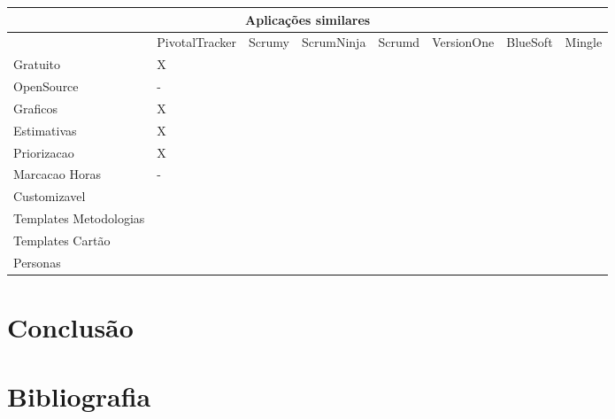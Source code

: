 \documentclass[titlepage,a4paper]{article}
\begin{document}
\begin{sidewaystable}
	\begin{tabular}{|l|l|l|l|l|l|l|l}
		\hline
		\multicolumn{8}{|c|}{Aplicações similares} \\
		\hline
		 & PivotalTracker & Scrumy & ScrumNinja & Scrumd & VersionOne & BlueSoft & Mingle \\
		Gratuito & X & & & & & & \\
		OpenSource & - & & & & & & \\
		Graficos & X & & & & & & \\
		Estimativas & X & & & & & & \\
		Priorizacao & X & & & & & & \\
		Marcacao Horas & - & & & & & & \\
		Customizavel & & & & & & & \\
		Templates Metodologias & & & & & & & \\
		Templates Cartão & & & & & & & \\
		Personas & & & & & & & \\
		\hline
	\end{tabular}
\end{sidewaystable}

\section{Conclusão}

\section{Bibliografia}
\end{document}
